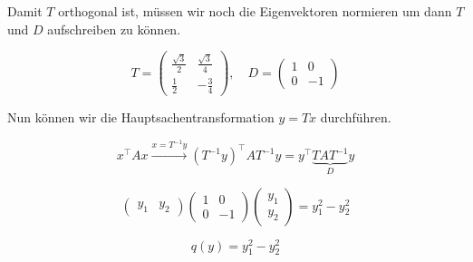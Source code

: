\begin{solution}
    Damit \( T \) orthogonal ist, müssen wir noch die Eigenvektoren normieren um dann \( T \) und \( D \) aufschreiben zu können. 

    \begin{equation*}
        T = \begin{pmatrix}
            \frac{\sqrt{3}}{2} & \frac{\sqrt{3}}{4} \\
            \frac{1}{2} & -\frac{3}{4} 
            \end{pmatrix}, \quad D = \begin{pmatrix}
                1 & 0 \\
                0 & -1
            \end{pmatrix}
    \end{equation*}

    Nun können wir die Hauptsachentransformation \( y = Tx \) durchführen.

    \begin{equation*}
        x^\top Ax \xrightarrow{x=T^{-1}y} (T^{-1}y)^\top A T^{-1}y = y^\top \underbrace{T A T^{-1}}_{D} y
    \end{equation*}

    \begin{equation*}
        \begin{pmatrix}
            y_1 & y_2
        \end{pmatrix} \begin{pmatrix}
            1 & 0 \\
            0 & -1
        \end{pmatrix} \begin{pmatrix}
            y_1 \\ y_2
        \end{pmatrix} = y_1^2 - y_2^2
    \end{equation*}

    \vspace{0.5\baselineskip}

    \begin{equation*}
        q(y) = y_1^2 - y_2^2
    \end{equation*}

\end{solution}